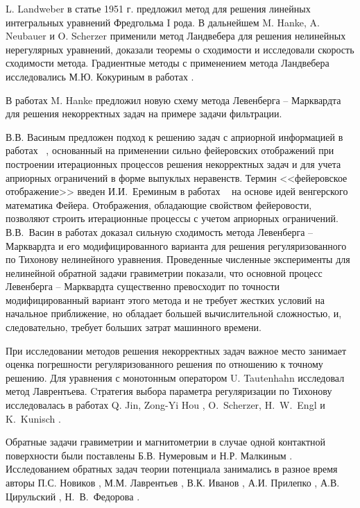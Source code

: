 {L. Landweber в статье \cite{Lan1951} 1951 г. предложил метод для решения линейных интегральных уравнений Фредгольма I рода. В дальнейшем M. Hanke, A. Neubauer и O. Scherzer \cite{HanNeuSch1995,Neu2000,NeuSch1995_2} применили метод Ландвебера для решения нелинейных нерегулярных уравнений, доказали теоремы о сходимости и исследовали скорость сходимости метода. Градиентные методы с применением метода Ландвебера исследовались М.Ю. Кокуриным в работах \cite{Kok2010_1,Kok2010_2}.

В работах \cite{Han1997,Han2010} M. Hanke предложил новую схему метода Левенберга -- Марквардта для решения некорректных задач на примере задачи фильтрации.

В.В. Васиным предложен подход к решению задач с априорной информацией в работах ~\cite{Vas1982, Vas1988,VasAge1993, VasEre2009}, основанный на применении сильно фейеровских отображений при построении итерационных процессов решения некорректных задач и для учета априорных ограничений в форме выпуклых неравенств. Термин <<фейеровское отображение>> введен И.И.~Ереминым в работах ~\cite{Ere1965, Ere1966, Ere1968} на основе идей венгерского математика Фейера. Отображения, обладающие свойством фейеровости, позволяют строить итерационные процессы с учетом априорных ограничений. В.В.~Васин в работах \cite{VasPer_2011,Vasin_2012} доказал сильную сходимость метода Левенберга -- Марквардта и его модифицированного варианта для решения регуляризованного по Тихонову нелинейного уравнения. Проведенные численные эксперименты для нелинейной обратной задачи гравиметрии показали, что основной процесс Левенберга -- Марквардта существенно превосходит по точности модифицированный вариант этого метода и не требует жестких условий на начальное приближение, но обладает большей вычислительной сложностью, и, следовательно, требует больших затрат машинного времени.

При исследовании методов решения некорректных задач важное место занимает оценка погрешности регуляризованного решения по отношению к точному решению. Для уравнения с монотонным оператором U. Tautenhahn \cite{Tau2002,Tau2004} исследовал метод Лаврентьева. Cтратегия выбора параметра регуляризации по Тихонову исследовалась в работах Q. Jin, Zong-Yi Hou \cite{JinZon1997,JinZon1999}, O.~Scherzer, H.~W.~Engl и K.~Kunisch \cite{SchEngKun1993}.

Обратные задачи гравиметрии и магнитометрии в случае одной контактной поверхности были поставлены Б.В. Нумеровым и Н.Р. Малкиным \cite{Num1930, Mal1931}. Исследованием обратных задач теории потенциала занимались в разное время авторы П.С. Новиков \cite{Nov1938}, М.М. Лаврентьев \cite{Lavr1956}, В.К. Иванов \cite{Iv1962_1}, А.И. Прилепко \cite{Pri1965}, А.В. Цирульский \cite{Tsi1990}, Н.~В.~Федорова \cite{FedTsi1976}.

}
